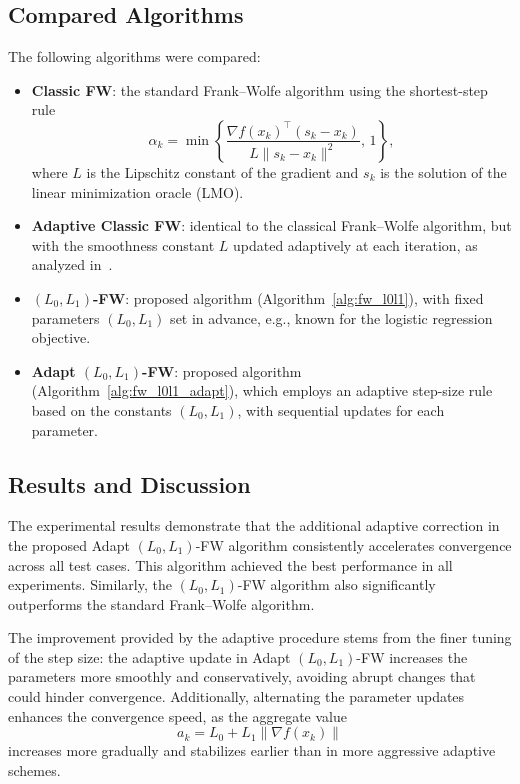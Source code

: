 \documentclass[runningheads]{llncs}
\begin{document}
	\subsection{Compared Algorithms}
	The following algorithms were compared:
	
	\begin{itemize}
		\item \textbf{Classic FW}: the standard Frank--Wolfe algorithm using the shortest-step rule
		\[
		\alpha_k = \min\left\{ \frac{\nabla f(x_k)^\top (s_k - x_k)}{L \| s_k - x_k \|^2},\, 1 \right\},
		\]
		where \(L\) is the Lipschitz constant of the gradient and \(s_k\) is the solution of the linear minimization oracle (LMO).
		
		\item \textbf{Adaptive Classic FW}: identical to the classical Frank--Wolfe algorithm, but with the smoothness constant \(L\) updated adaptively at each iteration, as analyzed in~\cite{aivazian2023adaptive}.
		
		\item \textbf{$(L_0,L_1)$-FW}: proposed algorithm (Algorithm~\ref{alg:fw_l0l1}), with fixed parameters \((L_0, L_1)\) set in advance, e.g., known for the logistic regression objective.
		
		\item \textbf{Adapt $(L_0,L_1)$-FW}: proposed algorithm (Algorithm~\ref{alg:fw_l0l1_adapt}), which employs an adaptive step-size rule based on the constants \((L_0, L_1)\), with sequential updates for each parameter.
	\end{itemize}
	
	\subsection{Results and Discussion}
	
	The experimental results demonstrate that the additional adaptive correction in the proposed Adapt $(L_0,L_1)$-FW algorithm consistently accelerates convergence across all test cases.  
	This algorithm achieved the best performance in all experiments. Similarly, the $(L_0,L_1)$-FW algorithm also significantly outperforms the standard Frank--Wolfe algorithm.
	
	The improvement provided by the adaptive procedure stems from the finer tuning of the step size: the adaptive update in Adapt $(L_0,L_1)$-FW increases the parameters more smoothly and conservatively, avoiding abrupt changes that could hinder convergence.  
	Additionally, alternating the parameter updates enhances the convergence speed, as the aggregate value
	\[
	a_k = L_0 + L_1 \| \nabla f(x_k) \|
	\]
	increases more gradually and stabilizes earlier than in more aggressive adaptive schemes.
	
\end{document}
